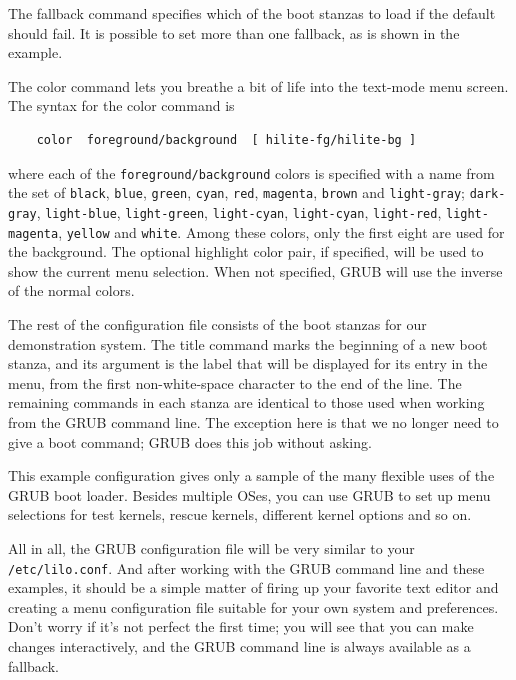 \documentclass{article}
\begin{document}
The fallback command specifies which of the boot stanzas to load if the default should fail. It is possible to set more than one fallback, as is shown in the example.

The color command lets you breathe a bit of life into the text-mode menu screen. The syntax for the color command is

\begin{verbatim}
    color  foreground/background  [ hilite-fg/hilite-bg ]
\end{verbatim}

where each of the \texttt{foreground/background} colors is specified with a name from the set of \texttt{black}, \texttt{blue}, \texttt{green}, \texttt{cyan}, \texttt{red}, \texttt{magenta}, \texttt{brown} and \texttt{light-gray};
\texttt{dark-gray}, \texttt{light-blue}, \texttt{light-green}, \texttt{light-cyan}, \texttt{light-cyan}, \texttt{light-red}, \texttt{light-magenta}, \texttt{yellow} and \texttt{white}.
Among these colors, only the first eight are used for the background.
The optional highlight color pair, if specified, will be used to show the current menu selection.
When not specified, GRUB will use the inverse of the normal colors.

The rest of the configuration file consists of the boot stanzas for our demonstration system. The title command marks the beginning of a new boot stanza, and its argument is the label that will be displayed for its entry in the menu, from the first non-white-space character to the end of the line. The remaining commands in each stanza are identical to those used when working from the GRUB command line. The exception here is that we no longer need to give a boot command; GRUB does this job without asking.

This example configuration gives only a sample of the many flexible uses of the GRUB boot loader. Besides multiple OSes, you can use GRUB to set up menu selections for test kernels, rescue kernels, different kernel options and so on.

All in all, the GRUB configuration file will be very similar to your \texttt{/etc/lilo.conf}. And after working with the GRUB command line and these examples, it should be a simple matter of firing up your favorite text editor and creating a menu configuration file suitable for your own system and preferences. Don't worry if it's not perfect the first time; you will see that you can make changes interactively, and the GRUB command line is always available as a fallback.
\end{document}
